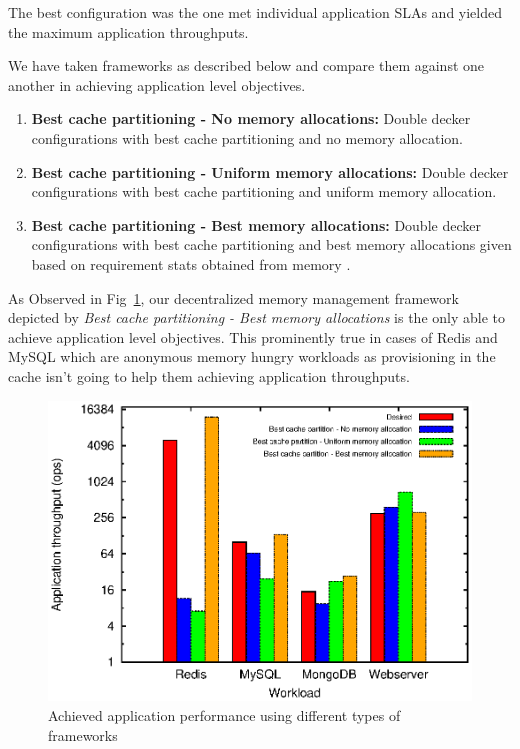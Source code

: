 	The best configuration was the one met individual application SLAs and yielded the maximum application 
	throughputs.	
		
	We have taken frameworks as described below and compare them against one another in achieving application level objectives.
	  \begin{enumerate}
	    \item \textbf{Best cache partitioning - No memory allocations:} Double decker configurations with best cache partitioning
	    and no memory allocation.
	    \item \textbf{Best cache partitioning - Uniform memory allocations:} Double decker configurations with best cache partitioning
	    and uniform memory allocation.
	    \item \textbf{Best cache partitioning - Best memory allocations:} Double decker configurations with best cache partitioning
	    and best memory allocations given based on requirement stats obtained from memory \cg{}.
	  \end{enumerate}
    
	As Observed in Fig~\ref{plot:dd_sdc_results}, our decentralized memory management framework depicted by 
	\textit{Best cache partitioning - Best memory allocations} is the only able to achieve application level 
	objectives. This prominently true in cases of Redis and MySQL which are anonymous memory hungry workloads
	as provisioning in the cache isn't going to help them achieving application throughputs.
	
	\begin{figure}
	  \centering
	  \includegraphics[scale=1]{images/dd_sdc_plot/sdc_dd.eps}
	  \caption{Achieved application performance using different types of frameworks}
	  \label{plot:dd_sdc_results}
	\end{figure}
	
